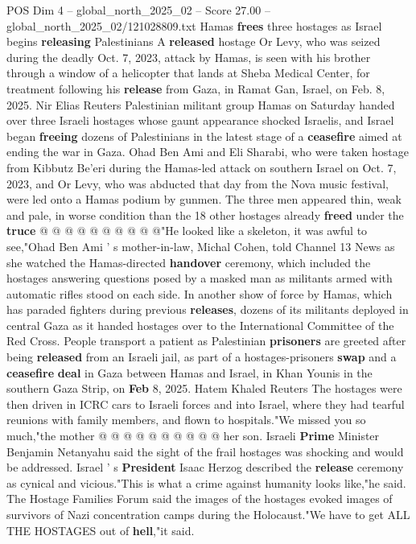 \begin{textsample}{POS Dim 4 – global\_north\_2025\_02 – Score 27.00 – global\_north\_2025\_02/121028809.txt}  \label{ex:f4_pos_059}
Hamas \textbf{frees} three hostages as Israel begins \textbf{releasing} Palestinians A \textbf{released} hostage Or Levy, who was seized during the deadly Oct. 7, 2023, attack by Hamas, is seen with his brother through a window of a helicopter that lands at Sheba Medical Center, for treatment following his \textbf{release} from Gaza, in Ramat Gan, Israel, on Feb. 8, 2025.
Nir Elias Reuters Palestinian militant group Hamas on Saturday handed over three Israeli hostages whose gaunt appearance shocked Israelis, and Israel began \textbf{freeing} dozens of Palestinians in the latest stage of a \textbf{ceasefire} aimed at ending the war in Gaza.
Ohad Ben Ami and Eli Sharabi, who were taken hostage from Kibbutz Be'eri during the Hamas-led attack on southern Israel on Oct. 7, 2023, and Or Levy, who was abducted that day from the Nova music festival, were led onto a Hamas podium by gunmen.
The three men appeared thin, weak and pale, in worse condition than the 18 other hostages already \textbf{freed} under the \textbf{truce} @ @ @ @ @ @ @ @ @ @"He looked like a skeleton, it was awful to see,"Ohad Ben Ami ' s mother-in-law, Michal Cohen, told Channel 13 News as she watched the Hamas-directed \textbf{handover} ceremony, which included the hostages answering questions posed by a masked man as militants armed with automatic rifles stood on each side.
In another show of force by Hamas, which has paraded fighters during previous \textbf{releases}, dozens of its militants deployed in central Gaza as it handed hostages over to the International Committee of the Red Cross.
People transport a patient as Palestinian \textbf{prisoners} are greeted after being \textbf{released} from an Israeli jail, as part of a hostages-prisoners \textbf{swap} and a \textbf{ceasefire} \textbf{deal} in Gaza between Hamas and Israel, in Khan Younis in the southern Gaza Strip, on \textbf{Feb} 8, 2025.
Hatem Khaled Reuters The hostages were then driven in ICRC cars to Israeli forces and into Israel, where they had tearful reunions with family members, and flown to hospitals."We missed you so much,"the mother @ @ @ @ @ @ @ @ @ @ her son.
Israeli \textbf{Prime} Minister Benjamin Netanyahu said the sight of the frail hostages was shocking and would be addressed.
Israel ' s \textbf{President} Isaac Herzog described the \textbf{release} ceremony as cynical and vicious."This is what a crime against humanity looks like,"he said.
The Hostage Families Forum said the images of the hostages evoked images of survivors of Nazi concentration camps during the Holocaust."We have to get ALL THE HOSTAGES out of \textbf{hell},"it said.

\end{textsample}
